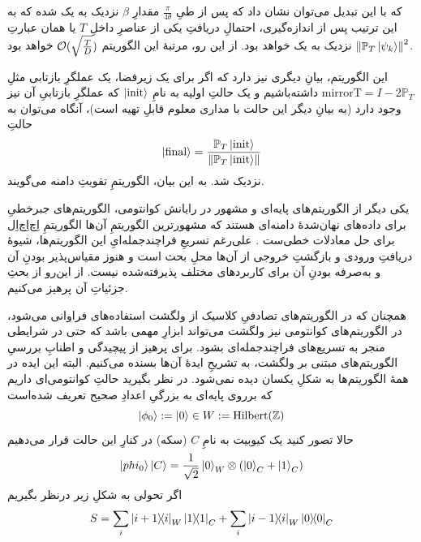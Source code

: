 که با این تبدیل می‌توان نشان داد که پس از طیِ
$\frac{\pi}{4\theta}$
مقدارِ $\beta$ نزدیک به یک شده که به این ترتیب پس از اندازه‌گیری، احتمالِ دریافتِ یکی از عناصرِ داخلِ $T$ یا همان عبارتِ 
$\norm{\mathbb{P}_T \ket{\psi_k}}^2$
نزدیک به یک خواهد بود. از این رو، مرتبهٔ این الگوریتم 
$\mathcal{O}(\sqrt{\frac{T}{D}})$
خواهد بود.

این الگوریتم، بیانِ دیگری نیز دارد که اگر برای یک زیرفضا، یک عملگرِ بازتابی مثلِ
$\text{mirrorT} = I - 2\mathbb{P}_T$
داشته‌باشیم و یک حالتِ اولیه به نامِ 
$\ket{\text{init}}$
 که عملگرِ بازتابیِ آن نیز وجود دارد (به بیانِ دیگر این حالت با مداری معلوم قابلِ تهیه است)، آنگاه می‌توان به حالتِ
\begin{equation}
    \ket{\text{final}} = \frac{\mathbb{P}_T \ket{\text{init}}}{\norm{\mathbb{P}_T \ket{\text{init}}}}
\end{equation}
نزدیک شد.
به این بیان، الگوریتمِ تقویتِ دامنه می‌گویند. 


یکی دیگر از الگوریتم‌های پایه‌ای و مشهور در رایانش کوانتومی، الگوریتم‌های جبرخطیِ برای داده‌های نهان‌شدۀ دامنه‌ای
 هستند که مشهورترین الگوریتمِ آن‌ها الگوریتمِ اِچ‌اِچ‌اِل برای حل معادلات خطی‌ست
. علی‌رغم تسریعِ فراچندجمله‌ایِ این الگوریتم‌ها، شیوهٔ دریافتِ ورودی و بازگشتِ خروجی از آن‌ها محلِ بحث است و هنوز مقیاس‌پذیر بودنِ آن و به‌صرفه بودنِ آن برای کاربردهای مختلف پذیرفته‌شده نیست. از این‌رو از بحثِ جزئیاتِ آن پرهیز می‌کنیم.


همچنان که در الگوریتم‌های تصادفیِ کلاسیک از ولگشت استفاده‌های فراوانی می‌شود، در الگوریتم‌های کوانتومی نیز ولگشت می‌تواند ابزارِ مهمی باشد که حتی در شرایطی منجر به تسریع‌های فراچندجمله‌ای بشود.
برای پرهیز از پیچیدگی و اطنابِ بررسیِ الگوریتم‌های مبتنی بر ولگشت، به تشریحِ ایدهٔ آن‌ها بسنده می‌کنیم. البته این ایده در همهٔ الگوریتم‌ها به شکلِ یکسان دیده نمی‌شود.
در نظر بگیرید حالتِ کوانتومی‌ای داریم که برروی پایه‌ای به بزرگیِ اعدادِ صحیح تعریف شده‌است
\begin{equation}
    \ket{\phi_0} := \ket{0} \in W := \mathrm{Hilbert}(\mathbb{Z})
\end{equation} 
حالا تصور کنید یک کیوبیت به نامِ $C$ (سکه) در کنارِ این حالت قرار می‌دهیم
\begin{equation}
    \ket{phi_0}\ket{C} = \frac{1}{\sqrt{2}}\ket{0}_W \otimes (\ket{0}_C + \ket{1}_C)
\end{equation}
اگر تحولی به شکلِ زیر درنظر بگیریم
\begin{equation}
    S = \sum_i \dyad{i + 1}{i}_W \dyad{1}_C +  \sum_i \dyad{i - 1}{i}_W \dyad{0}_C
\end{equation}

